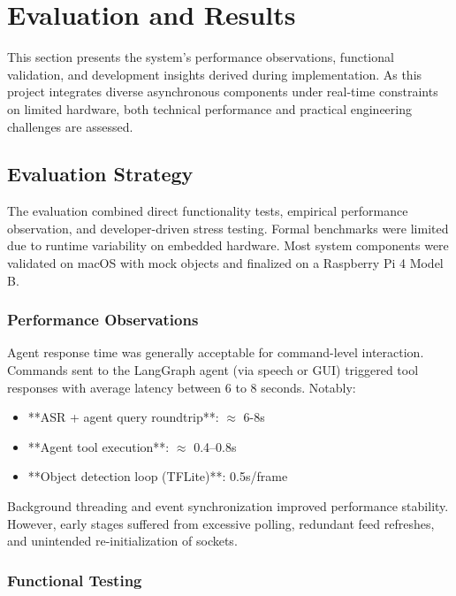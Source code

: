\chapter{Evaluation and Results}
\label{ch:evaluation}

This section presents the system’s performance observations, functional validation, and development insights derived during implementation. As this project integrates diverse asynchronous components under real-time constraints on limited hardware, both technical performance and practical engineering challenges are assessed.

\section{Evaluation Strategy}

The evaluation combined direct functionality tests, empirical performance observation, and developer-driven stress testing. Formal benchmarks were limited due to runtime variability on embedded hardware. Most system components were validated on macOS with mock objects and finalized on a Raspberry Pi 4 Model B.

\subsection{Performance Observations}

Agent response time was generally acceptable for command-level interaction. Commands sent to the LangGraph agent (via speech or GUI) triggered tool responses with average latency between 6 to 8 seconds. Notably:

\begin{itemize}
  \item **ASR + agent query roundtrip**: $\approx$ 6-8s
  \item **Agent tool execution**: $\approx$ 0.4–0.8s
  \item **Object detection loop (TFLite)**: 0.5s/frame
\end{itemize}

Background threading and event synchronization improved performance stability. However, early stages suffered from excessive polling, redundant feed refreshes, and unintended re-initialization of sockets.

\subsection{Functional Testing}

